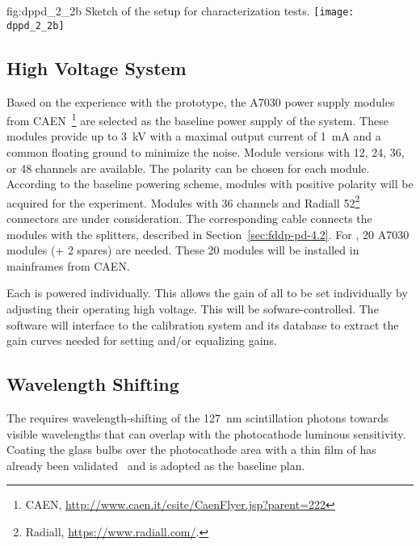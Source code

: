 \begin{dunefigure}{fig:dppd_2_2b}
{Sketch of the setup for  characterization tests.}
\texttt{[image: dppd\_2\_2b]}
\end{dunefigure}


\subsection{High Voltage System}
\label{sec:dp-pds-HV}

Based on the experience with the  prototype, the A7030 power supply modules from CAEN~\footnote{CAEN\texttrademark{}, \url{http://www.caen.it/csite/CaenFlyer.jsp?parent=222}} are selected as the baseline power supply of the   system. 
These modules provide up to \SI{3}{kV} with a maximal output current of \SI{1}{mA} and a common floating ground to minimize the noise. Module versions with \num{12}, \num{24}, \num{36}, or \num{48}  channels are available. The  polarity can be chosen for each module. According to the baseline  powering scheme, modules with positive  polarity will be acquired for the experiment. Modules with \num{36}  channels and Radiall \num{52}\footnote{Radiall\texttrademark{}, \url{https://www.radiall.com/}.}  connectors are under consideration. The corresponding  cable connects the modules with the  splitters, described in Section~\ref{sec:fddp-pd-4.2}. For \dpnumpmtch {}, \num{20} A7030 modules (+ \num{2} spares) are needed. These \num{20}  modules will be installed in mainframes from CAEN.

Each  is powered individually.  This allows the gain of all  to be set individually by adjusting their operating high voltage.
This will be sofware-controlled. The software will interface to the  calibration system and its database to extract the gain curves needed for setting and/or equalizing gains.

\subsection{Wavelength Shifting}
\label{sec:dppd-wls}

The \dual {} requires wavelength-shifting of the \SI{127}{nm} scintillation photons towards visible wavelengths that can overlap with the photocathode luminous sensitivity. Coating the  glass bulbs over the photocathode area with a thin film of   has already been validated~\cite{tpb} and is adopted as the baseline plan. 

